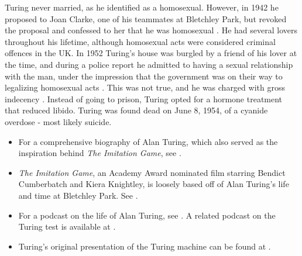 \documentclass[../../../include/open-logic-section]{subfiles}
\begin{document}
Turing never married, as he identified as a homosexual. However, in 1942 he
proposed to Joan Clarke, one of his teammates at Bletchley Park, but
revoked the proposal and confessed to her that he was homosexual
\citep[259]{Hodges2014}. He had several lovers throughout his lifetime,
although homosexual acts were considered criminal offences in the UK. In
1952 Turing's house was burgled by a friend of his lover at the time, and
during a police report he admitted to having a sexual relationship with the
man, under the impression that the government was on their way to
legalizing homosexual acts \citep[575]{Hodges2014}. This was not true, and
he was charged with gross indecency \citep[576]{Hodges2014}. Instead of
going to prison, Turing opted for a hormone treatment that reduced libido.
Turing was found dead on June 8, 1954, of a cyanide overdose - most likely
suicide.

\begin{reading}
\begin{itemize} 
\item For a comprehensive biography of
Alan Turing, which also served as the inspiration behind \emph{The
Imitation Game}, see \citet{Hodges2014}.

\item \emph{The Imitation Game}, an Academy Award nominated film starring
Bendict Cumberbatch and Kiera Knightley, is loosely based off of Alan
Turing’s life and time at Bletchley Park. See \citet{Imitation2014}.

\item For a podcast on the life of Alan Turing, see \citet{Radiolab2012}. A
related podcast on the Turing test is available at \citet{RadiolabND}.

\item Turing's original presentation of the Turing machine can be found at
\citet{Turing1937}.

\end{itemize}

\end{reading}
\end{document}
